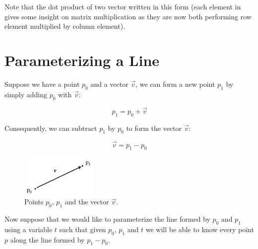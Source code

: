 \documentclass[12pt,letterpaper]{article}
\begin{document}
Note that the dot product of two vector written in this form (each element in  gives some insight on matrix multiplication as they are now both performing row element multiplied by column element).

\section{Parameterizing a Line}

Suppose we have a point $p_{0}$ and a vector $\overrightarrow{v}$, we can form a new point $p_{1}$ by simply adding $p_{0}$ with $\overrightarrow{v}$:

\begin{equation}
    p_{1} = p_{0} + \overrightarrow{v}
\end{equation}

Consequently, we can subtract $p_{1}$ by $p_{0}$ to form the vector $\overrightarrow{v}$:

\begin{equation}
    \overrightarrow{v} = p_{1} - p_{0}
\end{equation}

\begin{figure}[!h]
    \begin{center}
        \includegraphics[width=0.33\textwidth]{figures/01_vector}
    \end{center}
    \caption{Points $p_{0}$, $p_{1}$ and the vector $\overrightarrow{v}$.}
    \label{fig:vector-example}
\end{figure}

Now suppose that we would like to parameterize the line formed by $p_{0}$ and $p_{1}$ using a variable $t$ such that given $p_{0}$, $p_{1}$ and $t$ we will be able to know every point $p$ along the line formed by $p_{1} - p_{0}$.
\end{document}
